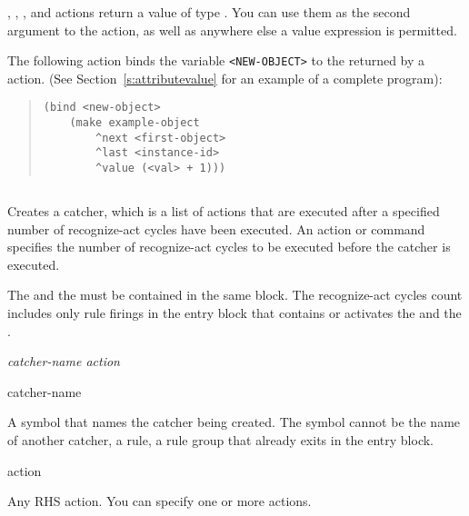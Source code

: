 \begin{note}
  , , , and  actions
  return a value of type . You can use them as the
  second argument to the  action, as well as anywhere else a
  value expression is permitted.
\end{note}

\Example

The following action binds the variable \verb|<NEW-OBJECT>| to the
 returned by a  action. (See
Section~\ref{s:attributevalue} for an example of a complete program):

\begin{quote}
\begin{verbatim}
(bind <new-object>
    (make example-object 
        ^next <first-object> 
        ^last <instance-id>
        ^value (<val> + 1)))
\end{verbatim}
\end{quote}         

\subsection{}

Creates a catcher, which is a list of actions that are executed after
a specified number of recognize-act cycles have been executed. An
 action or command specifies the number of recognize-act
cycles to be executed before the catcher is executed.

The  and the  must be contained in the same
block. The recognize-act cycles count includes only rule firings in
the entry block that contains or activates the  and the
.

\Format

 \it{catcher-name} \it{action}

\begin{arguments}
\item[catcher-name]

  A symbol that names the catcher being created. The symbol cannot be
  the name of another catcher, a rule, a rule group that already exits
  in the entry block.

\item[action]

  Any RHS action. You can specify one or more actions.
\end{arguments}

\Example

